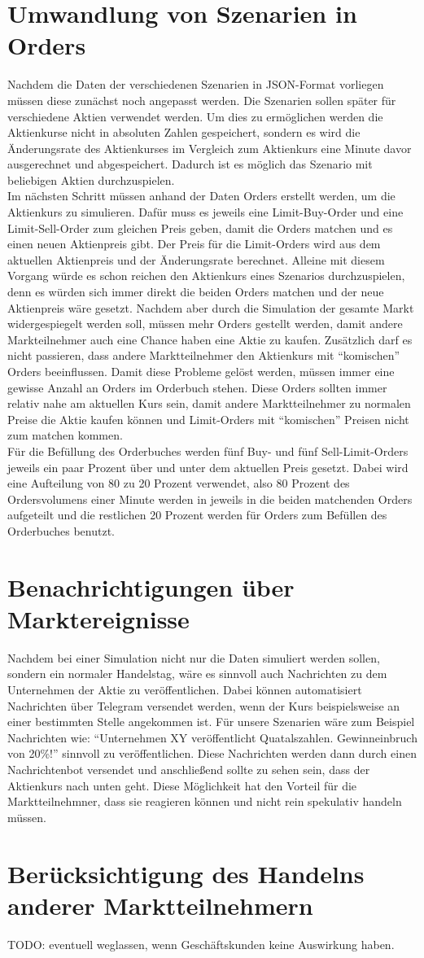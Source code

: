 \section{Umwandlung von Szenarien in Orders}
Nachdem die Daten der verschiedenen Szenarien in JSON-Format vorliegen müssen diese zunächst noch angepasst werden. Die 
Szenarien sollen später für verschiedene Aktien verwendet werden. Um dies zu ermöglichen werden die Aktienkurse nicht in 
absoluten Zahlen gespeichert, sondern es wird die Änderungsrate des Aktienkurses im Vergleich zum Aktienkurs eine Minute davor 
ausgerechnet und abgespeichert. Dadurch ist es möglich das Szenario mit beliebigen Aktien durchzuspielen. \\
Im nächsten Schritt müssen anhand der Daten Orders erstellt werden, um die Aktienkurs zu simulieren. Dafür muss es jeweils eine Limit-Buy-Order 
und eine Limit-Sell-Order zum gleichen Preis geben, damit die Orders matchen und es einen neuen Aktienpreis gibt. Der Preis für die 
Limit-Orders wird aus dem aktuellen Aktienpreis und der Änderungsrate berechnet. Alleine mit diesem Vorgang würde es schon reichen 
den Aktienkurs eines Szenarios durchzuspielen, denn es würden sich immer direkt die beiden Orders matchen und der neue Aktienpreis 
wäre gesetzt. Nachdem aber durch die Simulation der gesamte Markt widergespiegelt werden soll, müssen mehr Orders gestellt werden, damit 
andere Markteilnehmer auch eine Chance haben eine Aktie zu kaufen. Zusätzlich darf es nicht passieren, dass andere Marktteilnehmer 
den Aktienkurs mit \enquote{komischen} Orders beeinflussen. Damit diese Probleme gelöst werden, müssen immer eine gewisse Anzahl an Orders 
im Orderbuch stehen. Diese Orders sollten immer relativ nahe am aktuellen Kurs sein, damit andere Marktteilnehmer zu normalen Preise die 
Aktie kaufen können und Limit-Orders mit \enquote{komischen} Preisen nicht zum matchen kommen. \\
Für die Befüllung des Orderbuches werden fünf Buy- und fünf Sell-Limit-Orders jeweils ein paar Prozent über und unter dem aktuellen 
Preis gesetzt. Dabei wird eine Aufteilung von 80 zu 20 Prozent verwendet, also 80 Prozent des Ordersvolumens einer Minute werden in jeweils 
in die beiden matchenden Orders aufgeteilt und die restlichen 20 Prozent werden für Orders zum Befüllen des Orderbuches benutzt.
\section{Benachrichtigungen über Marktereignisse}
Nachdem bei einer Simulation nicht nur die Daten simuliert werden sollen, sondern ein normaler Handelstag, wäre es sinnvoll auch Nachrichten 
zu dem Unternehmen der Aktie zu veröffentlichen. Dabei können automatisiert Nachrichten über Telegram versendet werden, wenn der Kurs beispielsweise 
an einer bestimmten Stelle angekommen ist. Für unsere Szenarien wäre zum Beispiel Nachrichten wie: \enquote{Unternehmen XY veröffentlicht Quatalszahlen. 
Gewinneinbruch von 20\%!} sinnvoll zu veröffentlichen. Diese Nachrichten werden dann durch einen Nachrichtenbot versendet und anschließend sollte zu 
sehen sein, dass der Aktienkurs nach unten geht. Diese Möglichkeit hat den Vorteil für die Marktteilnehmner, dass sie reagieren können und nicht 
rein spekulativ handeln müssen.
\section{Berücksichtigung des Handelns anderer Marktteilnehmern}
TODO: eventuell weglassen, wenn Geschäftskunden keine Auswirkung haben.